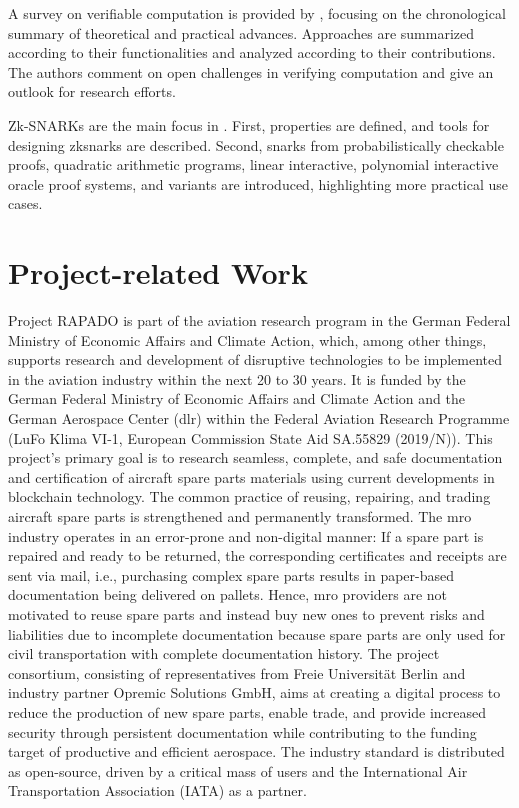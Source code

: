 A survey on verifiable computation is provided by \citet{Ahmad}, focusing on the chronological summary of theoretical and practical advances. Approaches are summarized according to their functionalities and analyzed according to their contributions. The authors comment on open challenges in verifying computation and give an outlook for research efforts. 

Zk-SNARKs are the main focus in \citet{NitulescuGentleIntroSNARKs}. First, properties are defined, and tools for designing \acrshort{zksnark}s are described. Second, \acrshort{snark}s from probabilistically checkable proofs, quadratic arithmetic programs, linear interactive, polynomial interactive oracle proof systems, and variants are introduced, highlighting more practical use cases. 

\section{Project-related Work}

Project RAPADO is part of the aviation research program in the German Federal Ministry of Economic Affairs and Climate Action, which, among other things, supports research and development of disruptive technologies to be implemented in the aviation industry within the next 20 to 30 years. It is funded by the German Federal Ministry of Economic Affairs and Climate Action and the German Aerospace Center (\acrshort{dlr}) within the Federal Aviation Research Programme (LuFo Klima VI-1, European Commission State Aid SA.55829 (2019/N)). This project's primary goal is to research seamless, complete, and safe documentation and certification of aircraft spare parts materials using current developments in blockchain technology. The common practice of reusing, repairing, and trading aircraft spare parts is strengthened and permanently transformed. The \acrshort{mro} industry operates in an error-prone and non-digital manner: If a spare part is repaired and ready to be returned, the corresponding certificates and receipts are sent via mail, i.e., purchasing complex spare parts results in paper-based documentation being delivered on pallets. Hence, \acrshort{mro} providers are not motivated to reuse spare parts and instead buy new ones to prevent risks and liabilities due to incomplete documentation because spare parts are only used for civil transportation with complete documentation history. The project consortium, consisting of representatives from Freie Universit{\"a}t Berlin and industry partner Opremic Solutions GmbH, aims at creating a digital process to reduce the production of new spare parts, enable trade, and provide increased security through persistent documentation while contributing to the funding target of productive and efficient aerospace. The industry standard is distributed as open-source, driven by a critical mass of users and the International Air Transportation Association (IATA) as a partner.


